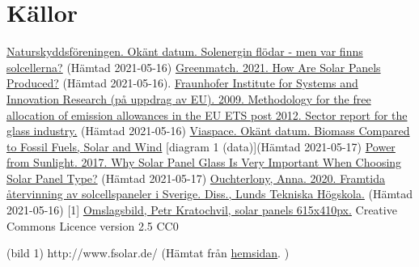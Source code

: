 \documentclass{article}
\begin{document}
\section{Källor}
\href{https://www.naturskyddsforeningen.se/nyheter/solenergin-flodar-men-var-finns-solcellerna}{Naturskyddsföreningen. Okänt datum. Solenergin flödar - men var finns solcellerna?}
(Hämtad 2021-05-16)
\newline
\newline
\href{https://www.greenmatch.co.uk/blog/2014/12/how-are-solar-panels-made}{Greenmatch. 2021. How Are Solar Panels Produced?}
(Hämtad 2021-05-16).
\newline
\newline
\href{https://ec.europa.eu/clima/sites/default/files/ets/allowances/docs/bm_study-glass_en.pdf}{Fraunhofer Institute for Systems and Innovation Research (på uppdrag av EU). 2009. Methodology for the free allocation of emission allowances in the EU ETS post 2012. Sector report for the glass industry.}
(Hämtad 2021-05-16)
\newline
\newline
\href{http://www.viaspace.com/biomass_versus_alternatives.php}{Viaspace. Okänt datum. Biomass Compared to Fossil Fuels, Solar and Wind}
[diagram 1 (data)](Hämtad 2021-05-17)
\newline
\newline
\href{https://www.powerfromsunlight.com/why-solar-panel-glass-is-very-important-when-choosing-solar-panel-type/}{Power from Sunlight. 2017. Why Solar Panel Glass Is Very Important When Choosing Solar Panel Type?}
(Hämtad 2021-05-17)
\newline
\newline
\href{https://lup.lub.lu.se/student-papers/search/publication/9006745}{Ouchterlony, Anna. 2020. Framtida återvinning av solcellspaneler i Sverige. Diss., Lunds Tekniska Högskola.}
(Hämtad 2021-05-16) [1]
\newline
\newline
\href{https://www.google.com/url?sa=i&url=https%3A%2F%2Fpixy.org%2F5941817%2F&psig=AOvVaw0mL8oneRcGAh-b2aowx3Oz&ust=1621416471737000&source=images&cd=vfe&ved=0CA0QjhxqFwoTCJjX35710vACFQAAAAAdAAAAABAD}{Omslagsbild, Petr Kratochvil, solar panels 615x410px.}
Creative Commons Licence version 2.5 CC0
\newline
\newline

(bild 1) http://www.fsolar.de/ (Hämtat från \href{https://www.powerfromsunlight.com/why-solar-panel-glass-is-very-important-when-choosing-solar-panel-type/}{hemsidan}. )
\pagebreak
\end{document}
